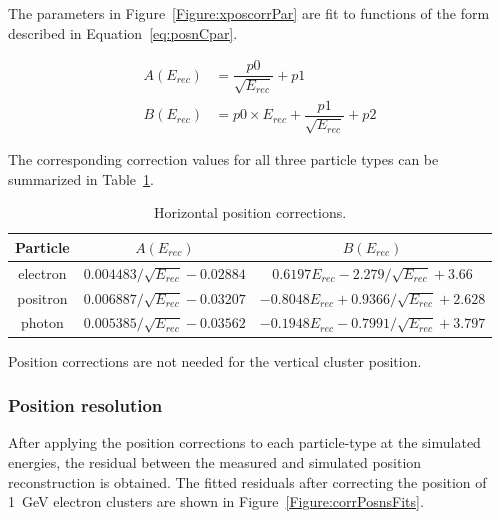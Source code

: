The parameters in Figure~\ref{Figure:xposcorrPar} are fit to functions of the form described in Equation~\eqref{eq:posnCpar}.

\begin{equation}
\label{eq:posnCpar}
\begin{split}
A(E_{rec}) & =  \dfrac{p0}{\sqrt{E_{rec}}}+p1\\
B(E_{rec}) & =  p0\times E_{rec} +\dfrac{p1}{\sqrt{E_{rec}}}+p2
\end{split}
\end{equation}

The corresponding correction values for all three particle types can be summarized in Table~\ref{tab:horizPosCorr}.

\begin{table}[htb]
\caption{Horizontal position corrections.}
\label{tab:horizPosCorr}
\centering
\begin{tabular}{|c|c|c|}
\toprule
Particle & $A(E_{rec})$ & $B(E_{rec})$ \\
\midrule
electron & $0.004483/\sqrt{E_{rec}}-0.02884$ & $0.6197E_{rec}-2.279/\sqrt{E_{rec}}+3.66$ \\
positron & $0.006887/\sqrt{E_{rec}}-0.03207$ & $-0.8048E_{rec}+0.9366/\sqrt{E_{rec}}+2.628$ \\
photon & $0.005385/\sqrt{E_{rec}}-0.03562$ & $-0.1948E_{rec}-0.7991/\sqrt{E_{rec}}+3.797$ \\
\bottomrule
\end{tabular}
\end{table}

Position corrections are not needed for the vertical cluster position.

\subsubsection{Position resolution}

After applying the position corrections to each particle-type at the simulated energies, the residual between the measured and simulated position reconstruction is obtained. The fitted residuals after correcting the position of 1~GeV electron clusters are shown in Figure~\ref{Figure:corrPosnsFits}.

